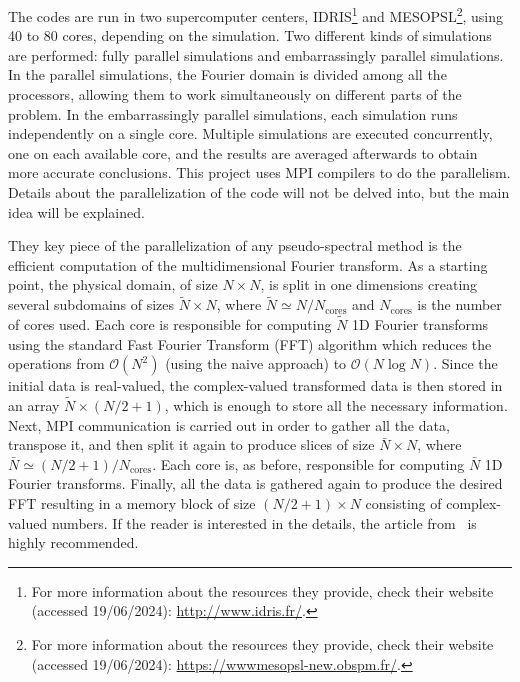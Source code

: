 \documentclass[../main.tex]{subfiles}
\begin{document}
The codes are run in two supercomputer centers, IDRIS\footnote{For more information about the resources they provide, check their website (accessed 19/06/2024): \url{http://www.idris.fr/}.} and MESOPSL\footnote{For more information about the resources they provide, check their website (accessed 19/06/2024): \url{https://wwwmesopsl-new.obspm.fr/}.}, using 40 to 80 cores, depending on the simulation. Two different kinds of simulations are performed: fully parallel simulations and embarrassingly parallel simulations. In the parallel simulations, the Fourier domain is divided among all the processors, allowing them to work simultaneously on different parts of the problem. In the embarrassingly parallel simulations, each simulation runs independently on a single core. Multiple simulations are executed concurrently, one on each available core, and the results are averaged afterwards to obtain more accurate conclusions. This project uses MPI compilers to do the parallelism. Details about the parallelization of the code will not be delved into, but the main idea will be explained.

They key piece of the parallelization of any pseudo-spectral method is the efficient computation of the multidimensional Fourier transform. As a starting point, the physical domain, of size $N\times N$, is split in one dimensions creating several subdomains of sizes $\tilde{N}\times N$, where $\tilde{N} \simeq N/N_\mathrm{cores}$ and $N_\mathrm{cores}$ is the number of cores used. Each core is responsible for computing $\tilde{N}$ 1D Fourier transforms using the standard Fast Fourier Transform (FFT) algorithm which reduces the operations from $\mathcal{O}(N^2)$ (using the naive approach) to $\mathcal{O}(N\log N)$. Since the initial data is real-valued, the complex-valued transformed data is then stored in an array $\tilde{N}\times (N/2 + 1)$, which is enough to store all the necessary information. Next, MPI communication is carried out in order to gather all the data, transpose it, and then split it again to produce slices of size $\bar{N}\times N$, where $\bar{N} \simeq (N/2 + 1)/N_\mathrm{cores}$. Each core is, as before,
responsible for computing $\bar{N}$ 1D Fourier transforms. Finally, all the data is gathered again to produce the desired FFT resulting in a memory block of size $(N/2 + 1)\times N$ consisting of complex-valued numbers. If the reader is interested in the details, the article from~\cite{mpi} is highly recommended.
\end{document}
